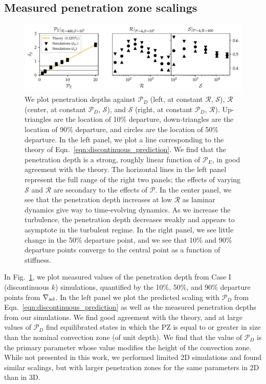 \documentclass{aastex631}
\newcommand{\gradad}{\ensuremath{\nabla_{\rm{ad}}}}
\newcommand{\mP}{\ensuremath{\mathcal{P}}}
\newcommand{\mR}{\ensuremath{\mathcal{R}}}
\newcommand{\mS}{\ensuremath{\mathcal{S}}}
\begin{document}
\subsection{Measured penetration zone scalings}

\begin{figure}[t!]
\centering
\includegraphics[width=\textwidth]{erf_3D_penetration_depths.pdf}
\caption{
We plot penetration depths against $\mP_D$ (left, at constant $\mR$, $\mS$), $\mR$ (center, at constant $\mP_D$, $\mS$), and $\mS$ (right, at constant $\mP_D$, $\mR$).
Up-triangles are the location of 10\% departure, down-triangles are the location of 90\% departure, and circles are the location of 50\% departure.
In the left panel, we plot a line corresponding to the theory of Eqn.~\ref{eqn:discontinuous_prediction}.
We find that the penetration depth is a strong, roughly linear function of $\mP_E$, in good agreement with the theory.
The horizontal lines in the left panel represent the full range of the right two panels; the effects of varying $\mS$ and $\mR$ are secondary to the effects of $\mP$.
In the center panel, we see that the penetration depth increases at low $\mR$ as laminar dynamics give way to time-evolving dynamics.
As we increase the turbulence, the penetration depth decreases weakly and appears to asymptote in the turbulent regime.
In the right panel, we see little change in the 50\% departure point, and we see that 10\% and 90\% departure points converge to the central point as a function of stiffness.
\label{fig:erf_3D_penetration_depths}
}
\end{figure}

In Fig.~\ref{fig:erf_3D_penetration_depths}, we plot measured values of the penetration depth from Case I (discontinuous $k$) simulations, quantified by the 10\%, 50\%, and 90\% departure points from $\gradad$.
In the left panel we plot the predicted scaling with $\mP_D$ from Eqn.~\ref{eqn:discontinuous_prediction} as well as the measured penetration depths from our simulations.
We find good agreement with the theory, and at large values of $\mP_D$ find equilibrated states in which the PZ is equal to or greater in size than the nominal convection zone (of unit depth).
We find that the value of $\mP_D$ is the primary parameter whose value modifies the height of the convection zone.
While not presented in this work, we performed limited 2D simulations and found similar scalings, but with larger penetration zones for the same parameters in 2D than in 3D.
\end{document}
